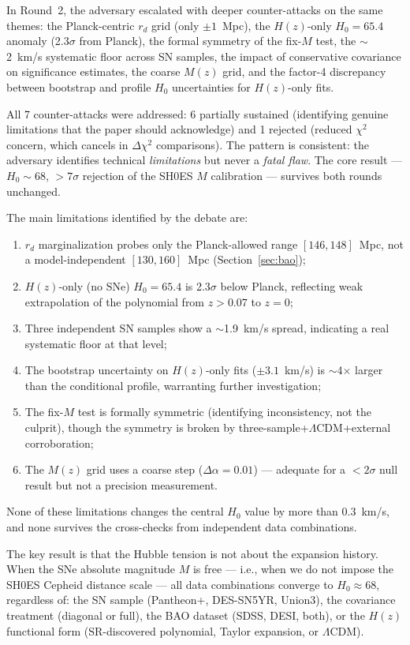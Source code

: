 \documentclass[twocolumn]{aastex631}
\begin{document}
In Round~2, the adversary escalated with deeper counter-attacks on the same
themes: the Planck-centric $r_d$ grid (only $\pm1$~Mpc), the $H(z)$-only
$H_0=65.4$ anomaly (2.3$\sigma$ from Planck), the formal symmetry of the
fix-$M$ test, the $\sim$2~km/s systematic floor across SN samples, the
impact of conservative covariance on significance estimates, the coarse
$M(z)$ grid, and the factor-4 discrepancy between bootstrap and profile
$H_0$ uncertainties for $H(z)$-only fits.

All 7 counter-attacks were addressed: 6 partially sustained (identifying
genuine limitations that the paper should acknowledge) and 1 rejected
(reduced $\chi^2$ concern, which cancels in $\Delta\chi^2$ comparisons).
The pattern is consistent: the adversary identifies technical \emph{limitations}
but never a \emph{fatal flaw}.  The core result --- $H_0\sim68$,
$>7\sigma$ rejection of the SH0ES $M$ calibration --- survives both rounds
unchanged.

The main limitations identified by the debate are:
\begin{enumerate}
  \item $r_d$ marginalization probes only the Planck-allowed range
        $[146,148]$~Mpc, not a model-independent $[130,160]$~Mpc
        (Section~\ref{sec:bao});
  \item $H(z)$-only (no SNe) $H_0=65.4$ is 2.3$\sigma$ below Planck,
        reflecting weak extrapolation of the polynomial from $z>0.07$ to
        $z=0$;
  \item Three independent SN samples show a $\sim$1.9~km/s spread,
        indicating a real systematic floor at that level;
  \item The bootstrap uncertainty on $H(z)$-only fits ($\pm 3.1$~km/s) is
        $\sim$4$\times$ larger than the conditional profile, warranting
        further investigation;
  \item The fix-$M$ test is formally symmetric (identifying inconsistency,
        not the culprit), though the symmetry is broken by
        three-sample+$\Lambda$CDM+external corroboration;
  \item The $M(z)$ grid uses a coarse step ($\Delta\alpha=0.01$) ---
        adequate for a $<2\sigma$ null result but not a precision
        measurement.
\end{enumerate}
None of these limitations changes the central $H_0$ value by more than
$0.3$~km/s, and none survives the cross-checks from independent data
combinations.

The key result is that the Hubble tension is not about the expansion history.
When the SNe absolute magnitude $M$ is free --- i.e., when we do not impose
the SH0ES Cepheid distance scale --- all data combinations converge to
$H_0\approx68$, regardless of: the SN sample (Pantheon+, DES-SN5YR, Union3),
the covariance treatment (diagonal or full), the BAO dataset (SDSS, DESI,
both), or the $H(z)$ functional form (SR-discovered polynomial, Taylor
expansion, or $\Lambda$CDM).
\end{document}
